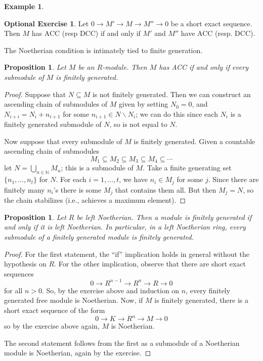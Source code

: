 \documentclass{amsart}[12pt]
\newcommand{\N}{\mathbb{N}}
\numberwithin{equation}{section}
\theoremstyle{plain} %
\newtheorem{prop}[equation]{Proposition}
\theoremstyle{definition}
\newtheorem{ex}[equation]{Example}
\newtheorem{exer}[equation]{Optional Exercise}
\theoremstyle{remark}
\begin{document}
\begin{ex}
\begin{exer}
Let $0 \to M' \to M \to M''\to0$ be a short exact sequence. Then $M$ has ACC (resp DCC) if and only if $M'$ and $M''$ have ACC (resp. DCC).
\end{exer}

The Noetherian condition is intimately tied to finite generation.

\begin{prop} Let $M$ be an $R$-module. Then $M$ has ACC if and only if every submodule of $M$ is finitely generated.
\end{prop}
\begin{proof}
Suppose that $N\subseteq M$ is not finitely generated. Then we can construct an ascending chain of submodules of $M$ given by setting $N_0=0$, and $N_{i+i} = N_i + n_{i+1}$ for some $n_{i+1}\in N\smallsetminus N_i$; we can do this since each $N_i$ is a finitely generated submodule of $N$, so is not equal to $N$.

Now suppose that every submodule of $M$ is finitely generated. Given a countable ascending chain of submodules
\[ M_1 \subseteq M_2 \subseteq M_3 \subseteq M_4 \subseteq \cdots\]
let $N=\bigcup _{n\in \N} M_n$; this is a submodule of $M$. Take a finite generating set $\{n_1,\dots,n_t\}$ for $N$. For each $i=1,\dots,t$, we have $n_i \in M_j$ for some $j$. Since there are finitely many $n_i$'s there is some $M_j$ that contains them all. But then $M_j=N$, so the chain stabilizes (i.e., achieves a maximum element).
\end{proof}




\begin{prop} Let $R$ be left Noetherian. Then a module is finitely generated if and only if it is left Noetherian. In particular, in a left Noetherian ring, every submodule of a finitely generated module is finitely generated.
\end{prop}
\begin{proof} For the first statement, the ``if'' implication holds in general without the hypothesis on $R$. For the other implication, observe that there are short exact sequences
\[ 0 \to R^{n-1} \to R^{n} \to R \to 0 \]
for all $n>0$. So, by the exercise above and induction on $n$, every finitely generated free module is Noetherian. Now, if $M$ is finitely generated, there is a short exact sequence of the form
\[ 0 \to K \to R^{n} \to M \to 0\]
so by the exercise above again, $M$ is Noetherian.

The second statement follows from the first as a submodule of a Noetherian module is Noetherian, again by the exercise.
\end{proof}


\end{ex}
\end{document}
